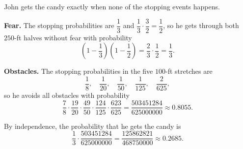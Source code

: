 John gets the candy exactly when none of the stopping events happens.

\textbf{Fear.} The stopping probabilities are $\dfrac{1}{3}$ and $\dfrac{1}{3}\cdot\dfrac{3}{2}=\dfrac{1}{2}$, so he gets through both $250$-ft halves without fear with probability
\[\left(1-\dfrac{1}{3}\right)\left(1-\dfrac{1}{2}\right)=\dfrac{2}{3}\cdot\dfrac{1}{2}=\dfrac{1}{3} .\]

\textbf{Obstacles.} The stopping probabilities in the five $100$-ft stretches are
\[\dfrac{1}{8},\quad\dfrac{1}{20},\quad\dfrac{1}{50},\quad\dfrac{1}{125},\quad\dfrac{2}{625},\]
so he avoids all obstacles with probability
\[\dfrac{7}{8}\cdot\dfrac{19}{20}\cdot\dfrac{49}{50}\cdot\dfrac{124}{125}\cdot\dfrac{623}{625}=\dfrac{503451284}{625000000}\approx0.8055 .\]

By independence, the probability that he gets the candy is
\[\dfrac{1}{3}\cdot\dfrac{503451284}{625000000}=\boxed{\dfrac{125862821}{468750000}}\approx0.2685 .\]
